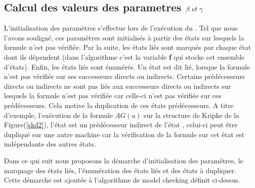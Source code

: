 
\subsection{Calcul des valeurs des parametres $\beta{} \; et\;\gamma{} $ }
 
{L'initialisation des paramètres s'effectue lors de l'exécution du \mc{}. Tel que nous l'avons souligné, ces paramètres  sont initialisés à partir des états sur lesquels la formule n'est pas vérifiée. Par la suite, les états liés sont marqués par chaque état dont ils dépendent (dans l'algorithme c'est la variable \textbf{f} qui stocke cet ensemble d'états). Enfin, les états liés sont énumérés. Un état est dit lié, lorsque la formule n'est pas vérifiée sur ses successeurs directs ou indirects. Certains prédécesseurs directs ou indirects ne sont pas liés aux successeurs directs ou indirects sur lesquels la formule n'est pas vérifiée car celle-ci n'est pas vérifiée sur ces prédécesseurs. Cela motive la duplication de ces états prédécesseurs. A titre d'exemple, l'exécution de la formule  \textit{$AG(a)$} sur la structure de Kripke de la Figure(\ref{skd2}), l'état \sneuf{} est un prédécesseur indirect de l'état , celui-ci peut être dupliqué sur une autre machine car la vérification de la formule sur cet état est indépendante des autres états. 

Dans ce qui suit nous proposons la démarche d'initialisation des paramètres, le marquage des états liés, l'énumération des états liés et des états à dupliquer. Cette démarche est ajoutée à l'algorithme de model checking définit ci-dessus.
}

